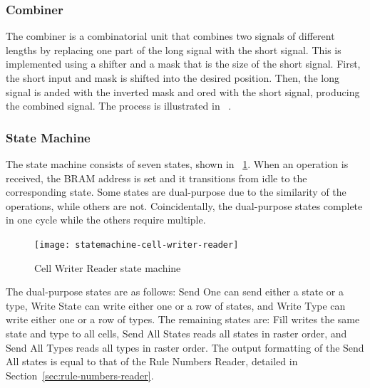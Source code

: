 \subsubsection{Combiner}

The combiner is a combinatorial unit that combines two signals of different lengths by replacing one part of the long signal with the short signal.
This is implemented using a shifter and a mask that is the size of the short signal.
First, the short input and mask is shifted into the desired position.
Then, the long signal is anded with the inverted mask and ored with the short signal, producing the combined signal.
The process is illustrated in \figurename~.

\subsubsection{State Machine}

The state machine consists of seven states, shown in \figurename~\ref{fig:statemachine-cell-writer-reader}.
When an operation is received, the BRAM address is set and it transitions from idle to the corresponding state.
Some states are dual-purpose due to the similarity of the operations, while others are not.
Coincidentally, the dual-purpose states complete in one cycle while the others require multiple\footnotemark.

\begin{figure}[!ht]
    \centering
    \texttt{[image: statemachine-cell-writer-reader]}
    \caption{Cell Writer Reader state machine}
    \label{fig:statemachine-cell-writer-reader}
\end{figure}

The dual-purpose states are as follows:
Send One can send either a state or a type, Write State can write either one or a row of states, and Write Type can write either one or a row of types.
The remaining states are:
Fill writes the same state and type to all cells, Send All States reads all states in raster order, and Send All Types reads all types in raster order.
The output formatting of the Send All states is equal to that of the Rule Numbers Reader, detailed in Section~\ref{sec:rule-numbers-reader}.


